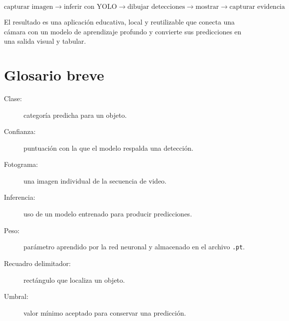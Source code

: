 \documentclass[11pt,a4paper]{article}
\newcommand{\archivo}[1]{\nolinkurl{#1}}
\begin{document}
\[
\text{capturar imagen}
\rightarrow
\text{inferir con YOLO}
\rightarrow
\text{dibujar detecciones}
\rightarrow
\text{mostrar}
\rightarrow
\text{capturar evidencia}
\]

El resultado es una aplicación educativa, local y reutilizable que conecta una
cámara con un modelo de aprendizaje profundo y convierte sus predicciones en
una salida visual y tabular.

\section*{Glosario breve}

\begin{description}
  \item[Clase:] categoría predicha para un objeto.
  \item[Confianza:] puntuación con la que el modelo respalda una detección.
  \item[Fotograma:] una imagen individual de la secuencia de video.
  \item[Inferencia:] uso de un modelo entrenado para producir predicciones.
  \item[Peso:] parámetro aprendido por la red neuronal y almacenado en el
  archivo \archivo{.pt}.
  \item[Recuadro delimitador:] rectángulo que localiza un objeto.
  \item[Umbral:] valor mínimo aceptado para conservar una predicción.
\end{description}
\end{document}
